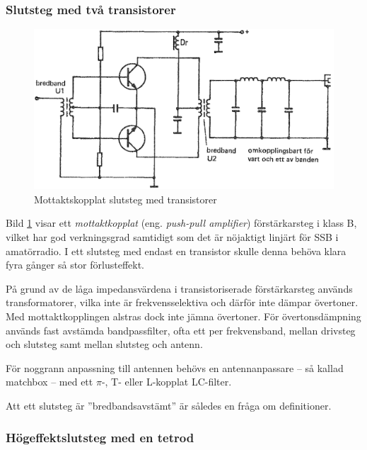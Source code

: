 \subsubsection{Slutsteg med två transistorer}

\begin{figure}
\includegraphics[width=\textwidth]{images/cropped_pdfs/bild_2_3-49.pdf}
\caption{Mottaktskopplat slutsteg med transistorer}
\label{fig:BildII3-49}
\end{figure}

Bild \ref{fig:BildII3-49} visar ett \emph{mottaktkopplat} (eng.
\emph{push-pull amplifier}) förstärkarsteg i klass B, vilket har god verkningsgrad
samtidigt som det är nöjaktigt linjärt för SSB i amatörradio.
I ett slutsteg med endast en transistor skulle denna behöva klara fyra gånger
så stor förlusteffekt.

På grund av de låga impedansvärdena i transistoriserade förstärkarsteg används
transformatorer, vilka inte är frekvensselektiva och därför inte dämpar
övertoner.
Med mottaktkopplingen alstras dock inte jämna övertoner.
För övertonsdämpning används fast avstämda bandpassfilter, ofta ett per
frekvensband, mellan drivsteg och slutsteg samt mellan slutsteg och antenn.

För noggrann anpassning till antennen behövs en antennanpassare --
så kallad matchbox -- med ett \(\pi \)-, T- eller L-kopplat LC-filter.

Att ett slutsteg är ''bredbandsavstämt'' är således en fråga om definitioner.

\subsubsection{Högeffektslutsteg med en tetrod}

